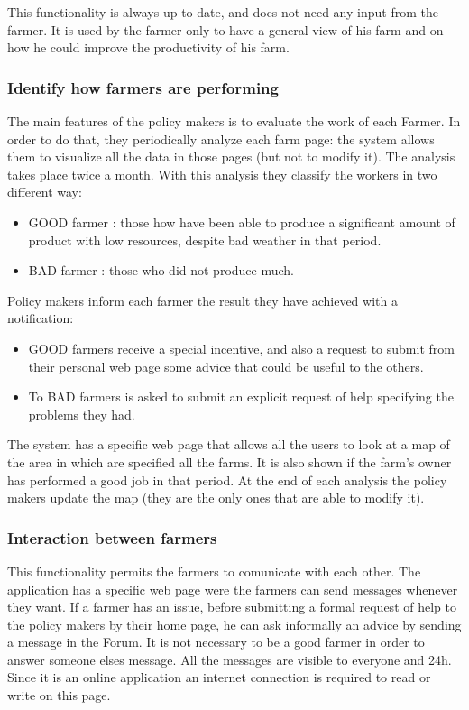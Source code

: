 This functionality is always up to date, and does not need 
any input from the farmer.
It is used by the farmer only to have a general view of 
his farm and on how he could improve the productivity of his farm.



\subsubsection{Identify how farmers are performing}
The main features of the policy makers is to evaluate the work of each Farmer. 
In order to do that, they periodically analyze each farm page: 
the system allows them to visualize all the data in those pages 
(but not to modify it).
The analysis takes place twice a month.
With this analysis they classify the workers in two different way:
\begin{itemize}
    \item GOOD farmer : those how have been able to produce a significant amount of product with low resources, despite bad weather in that period.
    \item BAD farmer : those who did not produce much.
\end{itemize}
Policy makers inform each farmer the result they have achieved with a notification: 
\begin{itemize}
    \item GOOD farmers receive a special 
    incentive, and also a request to submit 
    from their personal web page some advice that could be useful to the others. 
    \item To BAD farmers is asked to submit an explicit request of help specifying the problems they had.
\end{itemize}
The system has a specific web page that allows all 
the users to look at a map of the area in which are 
specified all the farms. It is also shown if the farm's owner has performed 
a good job in that period.
At the end of each analysis the policy makers 
update the map (they are the only ones that are able to modify it).


\subsubsection{Interaction between farmers}
This functionality permits the farmers to comunicate with each other. 
The application has a specific web page were the farmers can send messages 
whenever they want.
If a farmer has an issue, before submitting a formal request of help to 
the policy makers 
by their home page, he can ask informally an advice by sending a message 
in the Forum.
It is not necessary to be a good farmer in order to answer someone elses 
message. All the messages are visible to everyone and 24h. 
Since it is an online application an internet connection is required 
to read or write on this page.

